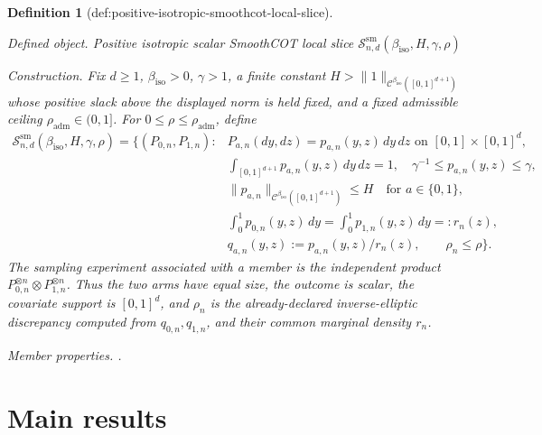 \documentclass{article}
\newtheorem{definition}{Definition}
\begin{document}
\begin{definition}[def:positive-isotropic-smoothcot-local-slice]\label{def:positive-isotropic-smoothcot-local-slice}
\par\smallskip\noindent\emph{Defined object.} Positive isotropic scalar SmoothCOT local slice \(\mathcal S^{\mathrm{sm}}_{n,d}(\beta_{\mathrm{iso}},H,\gamma,\rho)\)
\par\smallskip\noindent\emph{Construction.} Fix \(d\ge1\), \(\beta_{\mathrm{iso}}>0\), \(\gamma>1\), a finite constant \(H>\|1\|_{\mathcal C^{\beta_{\mathrm{iso}}}([0,1]^{d+1})}\) whose positive slack above the displayed norm is held fixed, and a fixed admissible ceiling \(\rho_{\mathrm{adm}}\in(0,1]\). For \(0\le\rho\le\rho_{\mathrm{adm}}\), define
\[
\begin{split}
\mathcal S^{\mathrm{sm}}_{n,d}(\beta_{\mathrm{iso}},H,\gamma,\rho)
=\biggl\{(P_{0,n},P_{1,n}):{}&P_{a,n}(dy,dz)=p_{a,n}(y,z)\,dy\,dz
\text{ on }[0,1]\times[0,1]^d,\\
&\int_{[0,1]^{d+1}}p_{a,n}(y,z)\,dy\,dz=1,\quad
\gamma^{-1}\le p_{a,n}(y,z)\le\gamma,\\
&\|p_{a,n}\|_{\mathcal C^{\beta_{\mathrm{iso}}}([0,1]^{d+1})}\le H
\quad\text{for }a\in\{0,1\},\\
&\int_0^1p_{0,n}(y,z)\,dy=\int_0^1p_{1,n}(y,z)\,dy=:r_n(z),\\
&q_{a,n}(y,z):=p_{a,n}(y,z)/r_n(z),\qquad \rho_n\le\rho\biggr\}.
\end{split}
\]
The sampling experiment associated with a member is the independent product \(P_{0,n}^{\otimes n}\otimes P_{1,n}^{\otimes n}\). Thus the two arms have equal size, the outcome is scalar, the covariate support is \([0,1]^d\), and \(\rho_n\) is the already-declared inverse-elliptic discrepancy computed from \(q_{0,n},q_{1,n}\), and their common marginal density \(r_n\).
\par\smallskip\noindent\emph{Member properties.} .
\end{definition}

\section{Main results}
\end{document}

